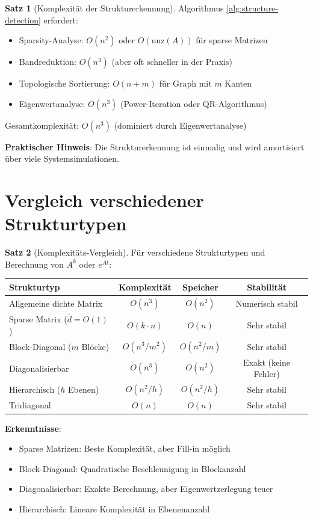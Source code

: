 ﻿\documentclass[a4paper,12pt]{report}
\theoremstyle{definition}
\newtheorem{satz}{Satz}
\begin{document}
	\begin{satz}[Komplexität der Strukturerkennung]
		Algorithmus \ref{alg:structure-detection} erfordert:
		\begin{itemize}
			\item Sparsity-Analyse: $O(n^2)$ oder $O(\text{nnz}(A))$ für sparse Matrizen
			\item Bandreduktion: $O(n^3)$ (aber oft schneller in der Praxis)
			\item Topologische Sortierung: $O(n + m)$ für Graph mit $m$ Kanten
			\item Eigenwertanalyse: $O(n^3)$ (Power-Iteration oder QR-Algorithmus)
		\end{itemize}
		
		Gesamtkomplexität: $O(n^3)$ (dominiert durch Eigenwertanalyse)
		
		\textbf{Praktischer Hinweis}: Die Strukturerkennung ist einmalig und wird amortisiert über viele Systemsimulationen.
	\end{satz}
	
	\section{Vergleich verschiedener Strukturtypen}
	
	\begin{satz}[Komplexitäts-Vergleich]
		Für verschiedene Strukturtypen und Berechnung von $A^k$ oder $e^{At}$:
		
		\begin{center}
			\begin{tabular}{|l|c|c|c|}
				\hline
				\textbf{Strukturtyp} & \textbf{Komplexität} & \textbf{Speicher} & \textbf{Stabilität} \\
				\hline
				Allgemeine dichte Matrix & $O(n^3)$ & $O(n^2)$ & Numerisch stabil \\
				Sparse Matrix ($\bar{d} = O(1)$) & $O(k \cdot n)$ & $O(n)$ & Sehr stabil \\
				Block-Diagonal ($m$ Blöcke) & $O(n^3/m^2)$ & $O(n^2/m)$ & Sehr stabil \\
				Diagonalisierbar & $O(n^3)$ & $O(n^2)$ & Exakt (keine Fehler) \\
				Hierarchisch ($h$ Ebenen) & $O(n^2/h)$ & $O(n^2/h)$ & Sehr stabil \\
				Tridiagonal & $O(n)$ & $O(n)$ & Sehr stabil \\
				\hline
			\end{tabular}
		\end{center}
		
		\textbf{Erkenntnisse}:
		\begin{itemize}
			\item Sparse Matrizen: Beste Komplexität, aber Fill-in möglich
			\item Block-Diagonal: Quadratische Beschleunigung in Blockanzahl
			\item Diagonalisierbar: Exakte Berechnung, aber Eigenwertzerlegung teuer
			\item Hierarchisch: Lineare Komplexität in Ebenenanzahl
		\end{itemize}
	\end{satz}
	
\end{document}
